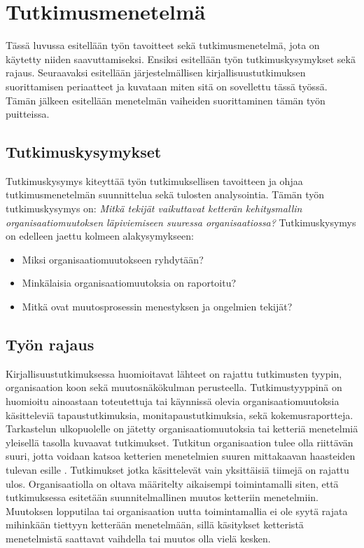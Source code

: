 \clearpage
\section{Tutkimusmenetelmä}
\label{sec:menetelma}

Tässä luvussa esitellään työn tavoitteet sekä tutkimusmenetelmä, jota on
käytetty niiden saavuttamiseksi. Ensiksi esitellään työn tutkimuskysymykset sekä
rajaus. Seuraavaksi esitellään järjestelmällisen kirjallisuustutkimuksen
suorittamisen periaatteet ja kuvataan miten sitä on sovellettu tässä työssä.
Tämän jälkeen esitellään menetelmän vaiheiden suorittaminen tämän työn
puitteissa.

\subsection{Tutkimuskysymykset}
Tutkimuskysymys kiteyttää työn tutkimuksellisen tavoitteen ja ohjaa
tutkimusmenetelmän suunnittelua sekä tulosten analysointia. Tämän työn
tutkimuskysymys on: \textit{Mitkä tekijät vaikuttavat ketterän kehitysmallin
organisaatiomuutoksen läpiviemiseen suuressa organisaatiossa?} Tutkimuskysymys
on edelleen jaettu kolmeen alakysymykseen:

\begin{itemize}
\item Miksi organisaatiomuutokseen ryhdytään?
\item Minkälaisia organisaatiomuutoksia on raportoitu?
\item Mitkä ovat muutosprosessin menestyksen ja ongelmien tekijät?
\end{itemize}

\subsection{Työn rajaus}
Kirjallisuustutkimuksessa huomioitavat lähteet on rajattu tutkimusten tyypin,
organisaation koon sekä muutosnäkökulman perusteella. Tutkimustyyppinä on
huomioitu ainoastaan toteutettuja tai käynnissä olevia organisaatiomuutoksia
käsitteleviä tapaustutkimuksia, monitapaustutkimuksia, sekä kokemusraportteja.
Tarkastelun ulkopuolelle on jätetty organisaatiomuutoksia tai ketteriä
menetelmiä yleisellä tasolla kuvaavat tutkimukset. Tutkitun organisaation tulee
olla riittävän suuri, jotta voidaan katsoa ketterien menetelmien suuren
mittakaavan haasteiden tulevan esille . Tutkimukset jotka
käsittelevät vain yksittäisiä tiimejä on rajattu ulos. Organisaatiolla on oltava
määritelty aikaisempi toimintamalli siten, että tutkimuksessa esitetään
suunnitelmallinen muutos ketteriin menetelmiin. Muutoksen lopputilaa tai
organisaation uutta toimintamallia ei ole syytä rajata mihinkään tiettyyn
ketterään menetelmään, sillä käsitykset ketteristä menetelmistä saattavat
vaihdella tai muutos olla vielä kesken.

